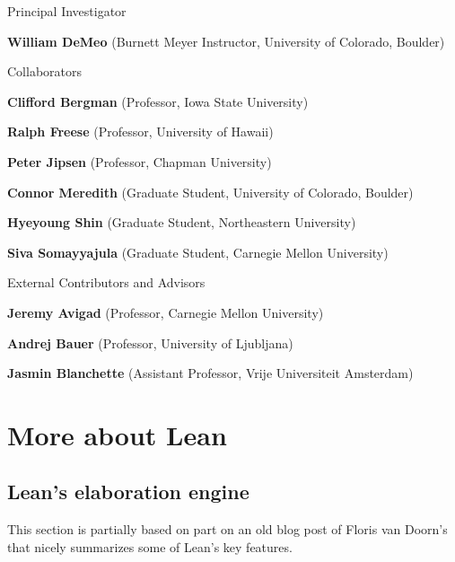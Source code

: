 \documentclass[12pt]{amsart}  %
\begin{document}
\noindent Principal Investigator

\vskip2mm
\hskip4.7mm {\bf William DeMeo} (Burnett Meyer Instructor, University of Colorado, Boulder)

\vskip5mm

\noindent Collaborators

\vskip2mm
\hskip4.7mm {\bf Clifford Bergman} (Professor, Iowa State University)

\vskip2mm
\hskip4.7mm {\bf Ralph Freese} (Professor, University of Hawaii)

\vskip2mm
\hskip4.7mm {\bf Peter Jipsen} (Professor, Chapman University)

\vskip2mm
\hskip4.7mm {\bf Connor Meredith} (Graduate Student, University of Colorado, Boulder)

\vskip2mm
\hskip4.7mm {\bf Hyeyoung Shin} (Graduate Student, Northeastern University)

\vskip2mm
\hskip4.7mm {\bf Siva Somayyajula} (Graduate Student, Carnegie Mellon University)



\vskip5mm

\noindent External Contributors and Advisors

\vskip2mm
\hskip4.7mm {\bf Jeremy Avigad} (Professor, Carnegie Mellon University)

\vskip2mm
\hskip4.7mm {\bf Andrej Bauer} (Professor, University of Ljubljana)

\vskip2mm
\hskip4.7mm {\bf Jasmin Blanchette} (Assistant Professor, Vrije Universiteit Amsterdam)

\ifextver

\newpage
\section{More about Lean}

\subsection{Lean's elaboration engine}
\label{app:elaboration}
This section is partially based on part on an old blog post
of Floris van Doorn's that nicely summarizes some of Lean's key features.
    
\end{document}
